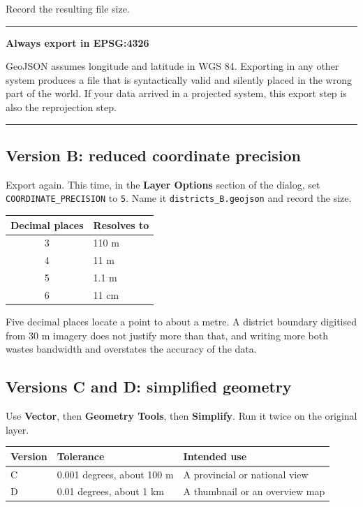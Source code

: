 \documentclass{article}
\newcommand{\cd}[1]{\texttt{#1}}
\newenvironment{keypoint}[1]
  {\par\vspace{.7em}\noindent\rule{\linewidth}{.6pt}\par\vspace{.15em}
   \noindent\textbf{#1}\par\nobreak\vspace{-.3em}}
  {\par\vspace{.15em}\noindent\rule{\linewidth}{.6pt}\par\vspace{.7em}}
\begin{document}
\vspace{.8em}
Record the resulting file size.

\begin{keypoint}{Always export in EPSG:4326}
GeoJSON assumes longitude and latitude in WGS 84. Exporting in any other
system produces a file that is syntactically valid and silently placed in
the wrong part of the world. If your data arrived in a projected system,
this export step is also the reprojection step.
\end{keypoint}


\subsection{Version B: reduced coordinate precision}

Export again. This time, in the \textbf{Layer Options} section of the
dialog, set \cd{COORDINATE\_PRECISION} to \cd{5}. Name it
\cd{districts\_B.geojson} and record the size.

\begin{tabularx}{\textwidth}{@{}c X@{}}
\toprule
\textbf{Decimal places} & \textbf{Resolves to} \\
\midrule
3 & 110 m \\
4 & 11 m \\
5 & 1.1 m \\
6 & 11 cm \\
\bottomrule
\end{tabularx}

\vspace{.8em}
Five decimal places locate a point to about a metre. A district boundary
digitised from 30 m imagery does not justify more than that, and writing
more both wastes bandwidth and overstates the accuracy of the data.

\subsection{Versions C and D: simplified geometry}

Use \textbf{Vector}, then \textbf{Geometry Tools}, then
\textbf{Simplify}. Run it twice on the original layer.

\begin{tabularx}{\textwidth}{@{}L{3cm} L{3.6cm} X@{}}
\toprule
\textbf{Version} & \textbf{Tolerance} & \textbf{Intended use} \\
\midrule
C & 0.001 degrees, about 100 m & A provincial or national view \\
D & 0.01 degrees, about 1 km   & A thumbnail or an overview map \\
\bottomrule
\end{tabularx}
\end{document}
